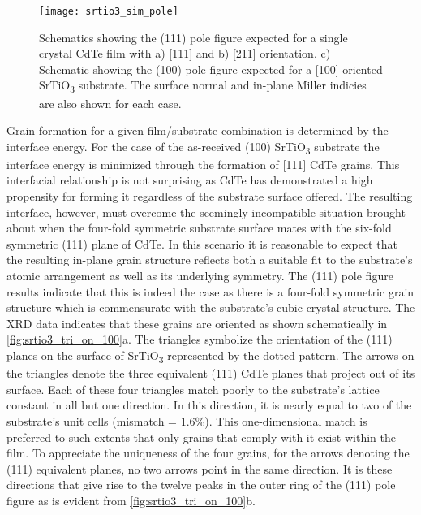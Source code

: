 \begin{figure}
 \centering \texttt{[image: srtio3\_sim\_pole]}
 \caption[Simulated pole figures of CdTe on SrTiO\(_3\) surfaces]{\label{fig:srtio3_sim_pole}Schematics showing the (111) pole figure expected for a single crystal CdTe film with a) [111] and b) [211] orientation.
  c) Schematic showing the (100) pole figure expected for a [100] oriented SrTiO\textsubscript{3} substrate.
  The surface normal and in-plane Miller indicies are also shown for each case.}
\end{figure}

Grain formation for a given film/substrate combination is determined by the interface energy.
For the case of the as-received (100) SrTiO\textsubscript{3} substrate the interface energy is minimized through the formation of [111] CdTe grains.
This interfacial relationship is not surprising as CdTe has demonstrated a high propensity for forming it regardless of the substrate surface offered\cite{Neretina2006}.
The resulting interface, however, must overcome the seemingly incompatible situation brought about when the four-fold symmetric substrate surface mates with the six-fold symmetric (111) plane of CdTe.
In this scenario it is reasonable to expect that the resulting in-plane grain structure reflects both a suitable fit to the substrate's atomic arrangement as well as its underlying symmetry.
The (111) pole figure results indicate that this is indeed the case as there is a four-fold symmetric grain structure which is commensurate with the substrate's cubic crystal structure.
The XRD data indicates that these grains are oriented as shown schematically in \cref{fig:srtio3_tri_on_100}a.
The triangles symbolize the orientation of the (111) planes on the surface of SrTiO\textsubscript{3} represented by the dotted pattern.
The arrows on the triangles denote the three equivalent (111) CdTe planes that project out of its surface.
Each of these four triangles match poorly to the substrate's lattice constant in all but one direction.
In this direction, it is nearly equal to two of the substrate's unit cells (mismatch = 1.6\%).
This
one-dimensional match is preferred to such extents that only grains that comply with it exist within the film.
To appreciate the uniqueness of the four grains, for the arrows denoting the (111) equivalent planes, no two arrows point in the same direction.
It is these directions that give rise to the twelve peaks in the outer ring of the (111) pole figure as is evident from \cref{fig:srtio3_tri_on_100}b.
